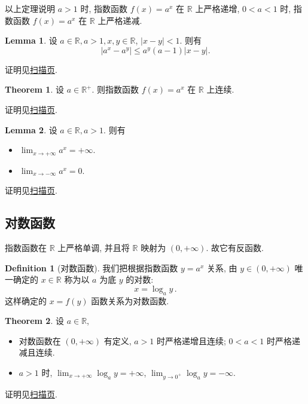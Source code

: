 \documentclass{book}
\newcommand{\abs}[1]{\left\lvert #1 \right\rvert}
\newcommand{\R}{\mathbb{R}}
\renewcommand{\le}{\leqslant}
\numberwithin{equation}{section}
\numberwithin{figure}{section}
\theoremstyle{definition}
\newtheorem{definition}{Definition}
\newtheorem{theorem}{Theorem}[section]
\newtheorem{lemma}{Lemma}[section]
\begin{document}
以上定理说明 $a>1$ 时, 指数函数 $f(x)=a^x$ 在 $\R$ 上严格递增, $0<a<1$ 时, 指数函数 $f(x)=a^x$ 在 $\R$ 上严格递减.

\begin{lemma}
  设 $a\in\R,a>1,x,y\in\R$, $\abs{x-y}<1$. 则有
  \begin{equation*}
    \abs{a^x-a^y}\le a^y(a-1)\abs{x-y}.
  \end{equation*}
\end{lemma}
证明见\hyperlink{scan:ExponentFunction}{扫描页}.

\begin{theorem}
  设 $a\in\R^+$. 则指数函数 $f(x)=a^x$ 在 $\R$ 上连续.
\end{theorem}
证明见\hyperlink{scan:ExponentFunction}{扫描页}.

\begin{lemma}
  设 $a\in\R,a>1$. 则有
  \begin{itemize}
    \item $\lim_{x\to+\infty}a^x=+\infty$.
    \item $\lim_{x\to-\infty}a^x=0$.
  \end{itemize}
\end{lemma}
证明见\hyperlink{scan:ExponentFunction}{扫描页}.

\subsection{对数函数}
指数函数在 $\R$ 上严格单调, 并且将 $\R$ 映射为 $(0,+\infty)$. 故它有反函数.
\begin{definition}[对数函数]
  我们把根据指数函数 $y=a^x$ 关系, 由 $y\in(0,+\infty)$ 唯一确定的 $x\in\R$ 称为以 $a$ 为底 $y$ 的对数:
  \begin{equation*}
    x=\log_a y\,.
  \end{equation*}
  这样确定的 $x=f(y)$ 函数关系为对数函数.
\end{definition}

\begin{theorem}
  设 $a\in\R$,
  \begin{itemize}
    \item 对数函数在 $(0,+\infty)$ 有定义, $a>1$ 时严格递增且连续; $0<a<1$ 时严格递减且连续.
    \item $a>1$ 时, $\lim_{x\to +\infty}\log_a y=+\infty$, $\lim_{y\to 0^+}\log_a y=-\infty$.
  \end{itemize}
\end{theorem}
证明见\hyperlink{scan:ExponentFunction}{扫描页}.
\end{document}

